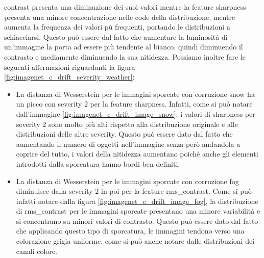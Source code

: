 contrast presenta una diminuzione dei suoi valori mentre la feature sharpness presenta una minore concentrazione nelle code della distribuzione, mentre aumenta la frequenza dei valori pù frequenti, portando le distribuzioni a schiacciarsi. Questo può essere dal fatto che aumentare la luminosità di un'immagine la porta ad essere più tendente al bianco, quindi diminuendo
il contrasto e mediamente diminuendo la sua nitidezza. Possiamo inoltre fare le seguenti affermazioni riguardanti la figura \ref{fig:imagenet_c_drift_severity_weather}:
\begin{itemize}
  \item La distanza di Wesserstein per le immagini sporcate con corruzione snow ha un picco con severity 2 per la feature sharpness. Infatti, come si può notare dall'immagine \ref{fig:imagenet_c_drift_image_snow}, 
  i valori di sharpness per severity 2 sono molto più alti rispetto alla distribuzione originale
  e alle distribuzioni delle altre severity. Questo può essere dato dal fatto che aumentando il numero di oggetti nell'immagine senza però andandola a coprire del tutto, i valori della nitidezza aumentano poiché anche gli elementi introdotti dalla sporcatura hanno bordi ben definiti. 
  \item La distanza di Wesserstein per le immagini sporcate con corruzione fog diminuisce dalla severity 2 in poi per la feature rms\_contrast. Come si può infatti notare dalla figura \ref{fig:imagenet_c_drift_image_fog}, la distribuzione di rms\_contrast per le
  immagini sporcate presentano una minore variabilità e si concentrano su minori valori di contrasto. Questo può essere dato dal fatto che applicando questo tipo di sporcatura, le immagini tendono verso una colorazione grigia uniforme, come si può anche notare dalle distribuzioni dei canali colore.
\end{itemize}

